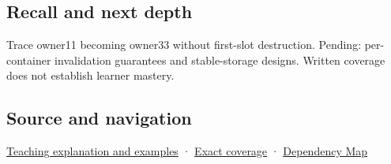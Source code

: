 \subsection{Recall and next depth}\label{appendix-f9b8b9188c7f-recall-and-next-depth}

Trace owner11 becoming owner33 without first-slot destruction. Pending: per-container invalidation guarantees and stable-storage designs. Written coverage does not establish learner mastery.

\subsection{Source and navigation}\label{appendix-f9b8b9188c7f-source-and-navigation}

\hyperref[01-foundations-i-ch003-when-a-valid-borrow-stops-naming-the-intended-thing]{Teaching explanation and examples} · \hyperref[appendix-fd090d982a15-m008---parts-113-126]{Exact coverage} · \hyperref[appendix-4ad47bdd269a]{Dependency Map}
